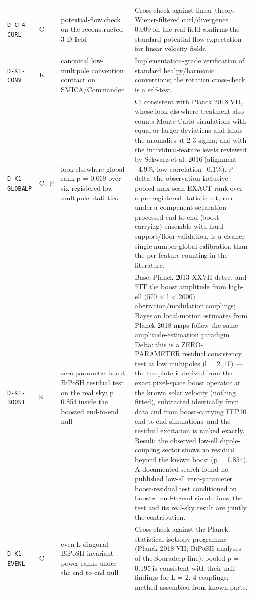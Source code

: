 \documentclass[10pt]{article}
\theoremstyle{definition}
\newcommand{\code}[1]{\texttt{\small #1}}
\begin{document}
\begin{center}
\begin{longtable}{p{2.0cm} p{0.7cm} p{5.4cm} p{6.5cm}}
\code{D-CF4-CURL} & C & potential-flow check on the reconstructed 3-D field & Cross-check against linear theory: Wiener-filtered curl/divergence = 0.009 on the real field confirms the standard potential-flow expectation for linear velocity fields. \\[2pt]
\code{D-K1-CONV} & K & canonical low-multipole convention contract on SMICA/Commander & Implementation-grade verification of standard healpy/harmonic conventions; the rotation cross-check is a self-test. \\[2pt]
\code{D-K1-GLOBALP} & C+P & look-elsewhere global rank p = 0.039 over six registered low-multipole statistics & C: consistent with Planck 2018 VII, whose look-elsewhere treatment also counts Monte-Carlo simulations with equal-or-larger deviations and lands the anomalies at 2-3 sigma; and with the individual-feature levels reviewed by Schwarz et al. 2016 (alignment ~4.9\%, low correlation ~0.1\%). P delta: the observation-inclusive pooled max-scan EXACT rank over a pre-registered statistic set, run under a component-separation-processed end-to-end (boost-carrying) ensemble with hard support/floor validation, is a cleaner single-number global calibration than the per-feature counting in the literature. \\[2pt]
\code{D-K1-BOOST} & S & zero-parameter boost-BiPoSH residual test on the real sky: p = 0.854 inside the boosted end-to-end null & Base: Planck 2013 XXVII detect and FIT the boost amplitude from high-ell (500 < l < 2000) aberration/modulation couplings; Bayesian local-motion estimates from Planck 2018 maps follow the same amplitude-estimation paradigm. Delta: this is a ZERO-PARAMETER residual consistency test at low multipoles (l = 2..10) — the template is derived from the exact pixel-space boost operator at the known solar velocity (nothing fitted), subtracted identically from data and from boost-carrying FFP10 end-to-end simulations, and the residual excitation is ranked exactly. Result: the observed low-ell dipole-coupling sector shows no residual beyond the known boost (p = 0.854). A documented search found no published low-ell zero-parameter boost-residual test conditioned on boosted end-to-end simulations; the test and its real-sky result are jointly the contribution. \\[2pt]
\code{D-K1-EVENL} & C & even-L diagonal BiPoSH invariant-power ranks under the end-to-end null & Cross-check against the Planck statistical-isotropy programme (Planck 2018 VII; BiPoSH analyses of the Souradeep line): pooled p = 0.195 is consistent with their null findings for L = 2, 4 couplings; method assembled from known parts. \\[2pt]

\end{longtable}
\end{center}
\end{document}
